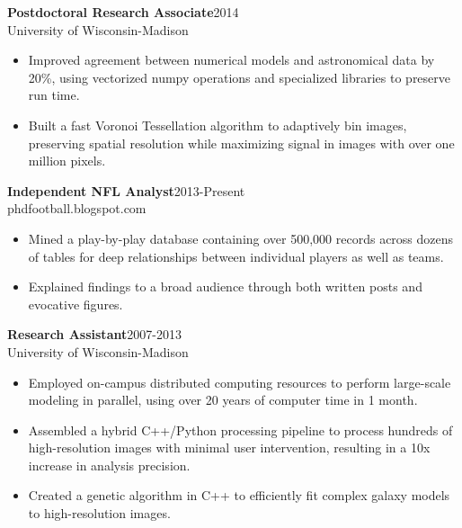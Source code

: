 \documentclass[11pt]{res}
\begin{document}
\begin{resume}
{\bf Postdoctoral Research Associate}\hfill\mbox{2014}\\
University of Wisconsin-Madison
                  \vspace* {0.01 in}\begin{itemize} \itemsep -2pt
                    \item Improved agreement between numerical models
                      and astronomical data by 20\%, using vectorized
                      numpy operations and specialized libraries to
                      preserve run time.
                    \item Built a fast Voronoi Tessellation algorithm
                      to adaptively bin images, preserving spatial
                      resolution while maximizing signal in images
                      with over one million pixels.
                    \end{itemize}
\vspace{-0.15in}
{\bf Independent NFL Analyst}\hfill\mbox{2013-Present}\\
phdfootball.blogspot.com
                  \vspace* {0.01 in}\begin{itemize} \itemsep -2pt
                    \item Mined a play-by-play database containing
                      over 500,000 records across dozens of tables
                      for deep relationships between individual players
                      as well as teams. 
                    \item Explained findings to a broad audience through both written posts and evocative figures.
                  \end{itemize} 
\vspace{-0.15in}
{\bf Research Assistant}\hfill\mbox{2007-2013}\\
University of Wisconsin-Madison
                  \vspace* {0.01 in}\begin{itemize} \itemsep -2pt
                   \item Employed on-campus distributed computing
                     resources to perform large-scale modeling in parallel, using over 20 years of computer time
                     in 1 month.
                   \item Assembled a hybrid C++/Python processing
                     pipeline to process hundreds of high-resolution images with
                     minimal user intervention, resulting in a 10x increase in analysis precision.
                   \item Created a genetic
                     algorithm in C++ to efficiently fit complex galaxy models to high-resolution images.

\end{itemize}
\end{resume}
\end{document}
